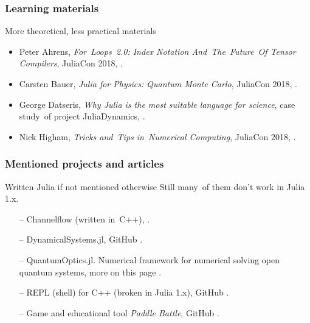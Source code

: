 \documentclass{beamer}  %
\begin{document}
\begin{frame}
  \frametitle{Learning materials}

  \begin{block}{More theoretical, less practical materials}
    \begin{itemize}
    \item Peter Ahrens, \emph{For~Loops~2.0: Index Notation
        And~The~Future~Of Tensor Compilers}, JuliaCon 2018,
      .
    \item Carsten Bauer, \emph{Julia for Physics: Quantum Monte
        Carlo}, JuliaCon 2018,
      .
    \item George Datseris, \emph{Why Julia is the most suitable
        language for science}, case study~of project JuliaDynamics,
      .
    \item Nick Higham, \emph{Tricks and~Tips in~Numerical Computing},
      JuliaCon 2018,
      .
    \end{itemize}
  \end{block}
  
\end{frame}





\begin{frame}
  \frametitle{Mentioned projects and articles}

  \begin{block}{Written Julia if not mentioned otherwise}
    Still many~of them don't work in Julia 1.x.
    \begin{itemize}
    \item[--] Channelflow (written in~C++),
      .
    \item[--] DynamicalSystems.jl, GitHub
      .
    \item[--] QuantumOptics.jl. Numerical framework for numerical
      solving open quantum systems, more on this page
      .
    \item[--] REPL (shell) for C++ (broken in Julia 1.x), GitHub
      .
    \item[--] Game and educational tool \emph{Paddle Battle}, GitHub
      .
    \end{itemize}
  \end{block}

\end{frame}
\end{document}
